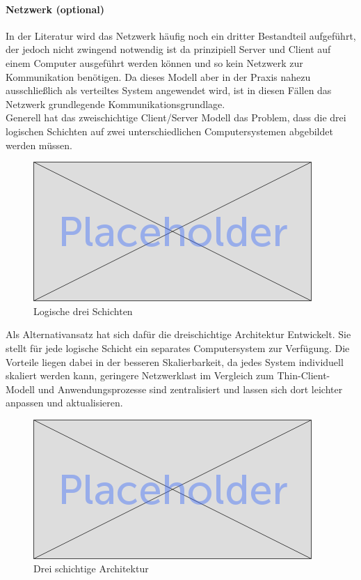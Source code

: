 	\paragraph{Netzwerk (optional)}
	In der Literatur wird das Netzwerk häufig noch ein dritter Bestandteil aufgeführt, der jedoch nicht zwingend notwendig ist da prinzipiell Server und Client auf einem Computer ausgeführt werden können und so kein Netzwerk zur Kommunikation benötigen. Da dieses Modell aber in der Praxis nahezu ausschließlich als verteiltes System angewendet wird, ist in diesen Fällen das Netzwerk grundlegende Kommunikationsgrundlage.
	\\
	
	Generell hat das zweischichtige Client/Server Modell das Problem, dass die drei logischen Schichten auf zwei unterschiedlichen Computersystemen abgebildet werden müssen. \\
	
	\begin{figure}[h]
		\centering
		\includegraphics[width=0.7\linewidth]{images/placeholder}
		\caption{Logische drei Schichten}
		\label{fig:log3schichten}
	\end{figure}
	
	Als Alternativansatz hat sich dafür die dreischichtige Architektur Entwickelt. Sie stellt für jede logische Schicht ein separates Computersystem zur Verfügung. Die Vorteile liegen dabei in der besseren Skalierbarkeit, da jedes System individuell skaliert werden kann, geringere Netzwerklast im Vergleich zum Thin-Client-Modell und Anwendungsprozesse sind zentralisiert und lassen sich dort leichter anpassen und aktualisieren.
	

	\begin{figure}[h]
		\centering
		\includegraphics[width=0.7\linewidth]{images/placeholder}
		\caption{Drei schichtige Architektur}
		\label{fig:3-tier-architecture}
	\end{figure}


